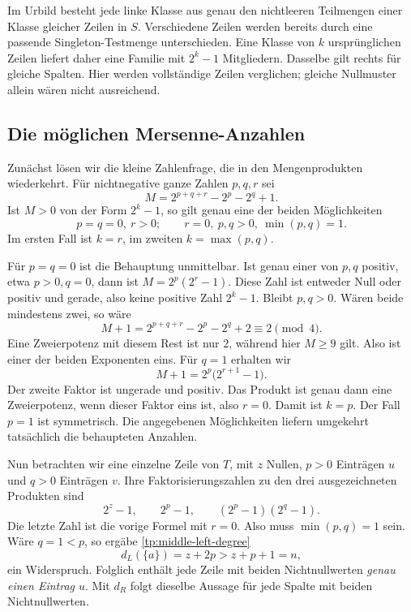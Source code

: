 \documentclass[a4paper,11pt]{article}
\theoremstyle{remark}
\begin{document}
Im Urbild besteht jede linke Klasse aus genau den nichtleeren
Teilmengen einer Klasse gleicher Zeilen in \(S\). Verschiedene
Zeilen werden bereits durch eine passende Singleton-Testmenge
unterschieden. Eine Klasse von \(k\) ursprünglichen Zeilen liefert
daher eine Familie mit \(2^k-1\) Mitgliedern. Dasselbe gilt rechts
für gleiche Spalten. Hier werden vollständige Zeilen verglichen;
gleiche Nullmuster allein wären nicht ausreichend.

\subsection{Die möglichen Mersenne-Anzahlen}

Zunächst lösen wir die kleine Zahlenfrage, die in den Mengenprodukten
wiederkehrt. Für nichtnegative ganze Zahlen \(p,q,r\) sei
\[
 M=2^{p+q+r}-2^p-2^q+1.
\]
Ist \(M>0\) von der Form \(2^k-1\), so gilt genau eine der
beiden Möglichkeiten
\begin{equation}
 p=q=0,\ r>0;\qquad
 r=0,\ p,q>0,\ \min(p,q)=1.
 \label{tp:middle-mersenne-cases}
\end{equation}
Im ersten Fall ist \(k=r\), im zweiten \(k=\max(p,q)\).

Für \(p=q=0\) ist die Behauptung unmittelbar. Ist genau einer von
\(p,q\) positiv, etwa \(p>0,q=0\), dann ist
\(M=2^p(2^r-1)\). Diese Zahl ist entweder Null oder positiv und
gerade, also keine positive Zahl \(2^k-1\). Bleibt \(p,q>0\).
Wären beide mindestens zwei, so wäre
\[
 M+1=2^{p+q+r}-2^p-2^q+2\equiv2\pmod4.
\]
Eine Zweierpotenz mit diesem Rest ist nur \(2\), während hier
\(M\ge9\) gilt. Also ist einer der beiden Exponenten eins.
Für \(q=1\) erhalten wir
\[
 M+1=2^p\bigl(2^{r+1}-1\bigr).
\]
Der zweite Faktor ist ungerade und positiv. Das Produkt ist genau
dann eine Zweierpotenz, wenn dieser Faktor eins ist, also \(r=0\).
Damit ist \(k=p\). Der Fall \(p=1\) ist symmetrisch. Die
angegebenen Möglichkeiten liefern umgekehrt tatsächlich die
behaupteten Anzahlen.

Nun betrachten wir eine einzelne Zeile von \(T\), mit \(z\) Nullen,
\(p>0\) Einträgen \(u\) und \(q>0\) Einträgen \(v\). Ihre
Faktorisierungszahlen zu den drei ausgezeichneten Produkten sind
\[
 2^z-1,\qquad 2^p-1,\qquad(2^p-1)(2^q-1).
\]
Die letzte Zahl ist die vorige Formel mit \(r=0\). Also muss
\(\min(p,q)=1\) sein. Wäre \(q=1<p\), so ergäbe
\eqref{tp:middle-left-degree}
\[
 d_L(\{a\})=z+2p>z+p+1=n,
\]
ein Widerspruch. Folglich enthält jede Zeile mit beiden Nichtnullwerten
\emph{genau einen Eintrag \(u\)}. Mit \(d_R\) folgt dieselbe
Aussage für jede Spalte mit beiden Nichtnullwerten.
\end{document}
